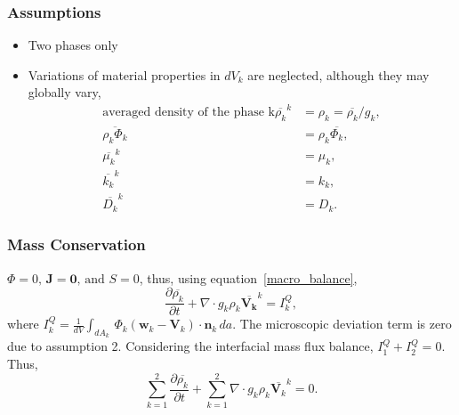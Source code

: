 \documentclass[11pt]{article}
\begin{document}
\subsubsection{Assumptions}
\begin{itemize}
	\item Two phases only
	\item Variations of material properties in $dV_k$ are neglected, although they may globally vary, 
	\begin{align}
		\text{averaged density of the phase k}\overline{\rho_k}^{k} &= \rho_k = \overline{\rho_k}/g_k,\\
		\overline{\rho_k \Phi_k} &= \rho_k \overline{\Phi_k},\\
		\overline{\mu_k}^{k} &= \mu_k,\\
		\overline{k_k}^{k} &= k_k,\\
		\overline{D_k}^{k} &= D_k.
	\end{align}
\end{itemize}
\subsubsection{Mass Conservation}
$\Phi=0,\,\mathbf{J} = \mathbf{0},\, \text{and } S = 0$, thus, using equation~\ref{macro_balance},
\begin{equation}\label{macro_mass_conservation}
	\frac{\partial \overline{\rho_k}}{\partial t} + \nabla\cdot g_k \rho_k \overline{\mathbf{V_k}}^k = I_k^{Q},
\end{equation}
where $I_k^{Q} = \frac{1}{dV}\int_{dA_{k}}\, \Phi_{k}(\mathbf{w}_{k} - \mathbf{V}_{k}) \cdot \mathbf{n}_{k}\,da$.
The microscopic deviation term is zero due to assumption 2. Considering the interfacial mass flux balance, $I_1^{Q} + I_2^{Q} = 0$. Thus,\newline
\begin{equation}
	\sum_{k=1}^{2}\frac{\partial \overline{\rho_k}}{\partial t} + \sum_{k=1}^{2} \nabla\cdot g_k \rho_k \overline{\mathbf{V}_k}^k = 0.
\end{equation}
\end{document}
